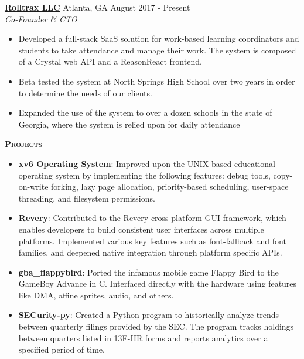 \documentclass{article}
\newcommand{\sectionHeader}[1]{{\large \textbf{\textsc{#1}}}\hspace{5pt}\xrfill[.5ex]{.4pt}}
\begin{document}
  \vspace{3pt}

  \href{https://rolltrax.com}{\textbf{Rolltrax LLC}} \hspace{3pt} {\footnotesize {}} Atlanta, GA \hspace*{\fill} {\footnotesize {}} \hspace{1pt} August 2017 - Present\\
  {\footnotesize {}} \hspace{1pt} \textit{Co-Founder \& CTO}
  \begin{itemize}
    \item Developed a full-stack SaaS solution for work-based learning coordinators and students to take attendance and manage their work. The system is composed of a Crystal web API and a ReasonReact frontend.
    \item Beta tested the system at North Springs High School over two years in order to determine the needs of our clients.
    \item Expanded the use of the system to over a dozen schools in the state of Georgia, where the system is relied upon for daily attendance
  \end{itemize}

  \vspace{8pt}

  \sectionHeader{Projects}

  \vspace{3pt}

  \begin{itemize}
    \item \textbf{xv6 Operating System}: Improved upon the UNIX-based educational operating system by implementing the following features: debug tools, copy-on-write forking, lazy page allocation, priority-based scheduling, user-space threading, and filesystem permissions.
    \item \textbf{Revery}: Contributed to the Revery cross-platform GUI framework, which enables developers to build consistent user interfaces across multiple platforms. Implemented various key features such as font-fallback and font families, and deepened native integration through platform specific APIs.
    \item \textbf{gba\_flappybird}: Ported the infamous mobile game Flappy Bird to the GameBoy Advance in C. Interfaced directly with the hardware using features like DMA, affine sprites, audio, and others. 
    \item \textbf{SECurity-py}: Created a Python program to historically analyze trends between quarterly filings provided by the SEC. The program tracks holdings between quarters listed in 13F-HR forms and reports analytics over a specified period of time.
  \end{itemize}
\end{document}
